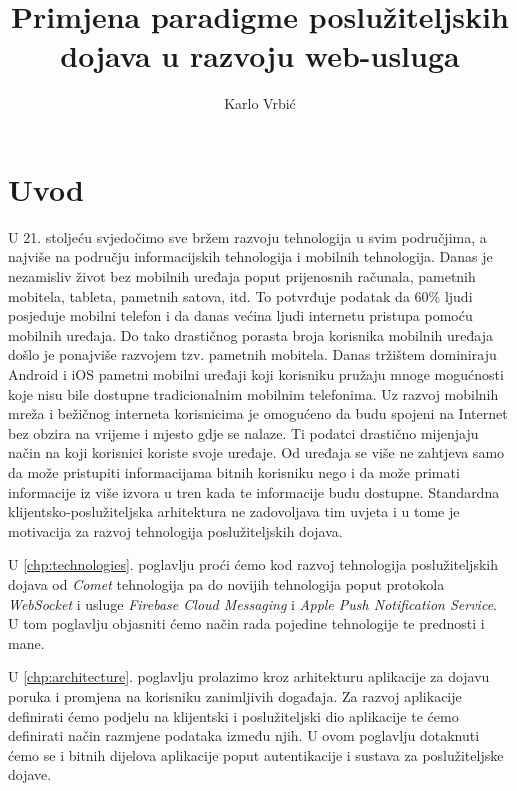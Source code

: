 \documentclass[times, utf8, zavrsni]{fer}
\begin{document}
\title{Primjena paradigme poslužiteljskih dojava u razvoju web-usluga}
\author{Karlo Vrbić}

\maketitle

\zahvala{}

\tableofcontents
\listoffigures

\chapter{Uvod}

U 21. stoljeću svjedočimo sve bržem razvoju tehnologija u svim područjima, a najviše na području informacijskih tehnologija i mobilnih tehnologija. Danas je nezamisliv život bez mobilnih uređaja poput prijenosnih računala, pametnih mobitela, tableta, pametnih satova, itd. To potvrđuje podatak da 60\% ljudi posjeduje mobilni telefon i da danas većina ljudi internetu pristupa pomoću mobilnih uređaja. Do tako drastičnog porasta broja korisnika mobilnih uređaja došlo je ponajviše razvojem tzv. pametnih mobitela. Danas tržištem dominiraju Android i iOS pametni mobilni uređaji koji korisniku pružaju mnoge mogućnosti koje nisu bile dostupne tradicionalnim mobilnim telefonima. Uz razvoj mobilnih mreža i bežičnog interneta korisnicima je omogućeno da budu spojeni na Internet bez obzira na vrijeme i mjesto gdje se nalaze. Ti podatci drastično mijenjaju način na koji korisnici koriste svoje uređaje. Od uređaja se više ne zahtjeva samo da može pristupiti informacijama bitnih korisniku nego i da može primati informacije iz više izvora u tren kada te informacije budu dostupne. Standardna klijentsko-poslužiteljska arhitektura ne zadovoljava tim uvjeta i u tome je motivacija za razvoj tehnologija poslužiteljskih dojava.

U \ref{chp:technologies}. poglavlju proći ćemo kod razvoj tehnologija poslužiteljskih dojava od {\em Comet} tehnologija pa do novijih tehnologija poput protokola {\em WebSocket} i usluge {\em Firebase Cloud Messaging} i {\em Apple Push Notification Service}. U tom poglavlju objasniti ćemo način rada pojedine tehnologije te prednosti i mane.

U \ref{chp:architecture}. poglavlju prolazimo kroz arhitekturu aplikacije za dojavu poruka i promjena na korisniku zanimljivih događaja. Za razvoj aplikacije definirati ćemo podjelu na klijentski i poslužiteljski dio aplikacije te ćemo definirati način razmjene podataka između njih. U ovom poglavlju dotaknuti ćemo se i bitnih dijelova aplikacije poput autentikacije i sustava za poslužiteljske dojave.
\end{document}
